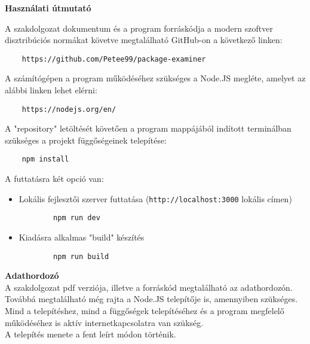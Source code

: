 \pagestyle{empty}

\noindent \textbf{\Large Használati útmutató}

\vskip 1cm

A szakdolgozat dokumentum és a program forráskódja a modern szoftver disztribúciós normákat követve megtalálható GitHub-on a következő linken:

\begin{verbatim}
	https://github.com/Petee99/package-examiner
\end{verbatim}

A számítógépen a program működéséhez szükséges a Node.JS megléte, amelyet az alábbi linken lehet elérni:

\begin{verbatim}
	https://nodejs.org/en/
\end{verbatim}

A "repository" letöltését követően a program mappájából indított terminálban szükséges a projekt függőségeinek telepítése:

\begin{verbatim}
	npm install
\end{verbatim}

A futtatásra két opció van:

\begin{itemize}
	\item Lokális fejlesztői szerver futtatása (\texttt{http://localhost:3000} lokális címen)
	\begin{verbatim}
		npm run dev
	\end{verbatim}
	\item Kiadásra alkalmas "build" készítés
	\begin{verbatim}
		npm run build
	\end{verbatim}
\end{itemize}

\noindent \textbf{Adathordozó}\\

A szakdolgozat pdf verziója, illetve a forráskód megtalálható az adathordozón. Továbbá megtalálható még rajta a Node.JS telepítője is, amennyiben szükséges.\\

Mind a telepítéshez, mind a függőségek telepítéséhez és a program megfelelő működéséhez is aktív internetkapcsolatra van szükség.\\

A telepítés menete a fent leírt módon történik.



